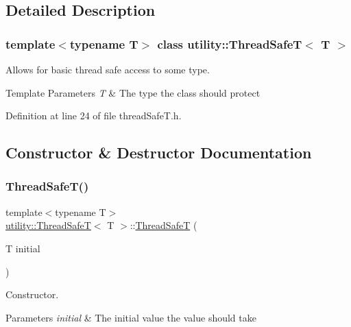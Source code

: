 \subsection{Detailed Description}
\subsubsection*{template$<$typename T$>$\newline
class utility\+::\+Thread\+Safe\+T$<$ T $>$}

Allows for basic thread safe access to some type. 


\begin{DoxyTemplParams}{Template Parameters}
{\em T} & The type the class should protect \\
\hline
\end{DoxyTemplParams}


Definition at line 24 of file thread\+Safe\+T.\+h.



\subsection{Constructor \& Destructor Documentation}
\mbox{\label{classutility_1_1ThreadSafeT_a7cdb74cfeaa11742df2953be2e43648c}} 
\subsubsection{\texorpdfstring{ThreadSafeT()}{ThreadSafeT()}}
{\footnotesize\ttfamily template$<$typename T$>$ \\
\mbox{\hyperlink{classutility_1_1ThreadSafeT}{utility\+::\+Thread\+SafeT}}$<$ T $>$\+::\mbox{\hyperlink{classutility_1_1ThreadSafeT}{Thread\+SafeT}} (\begin{DoxyParamCaption}\item[{T}]{initial }\end{DoxyParamCaption})\hspace{0.3cm}{\ttfamily [inline]}}



Constructor. 


\begin{DoxyParams}{Parameters}
{\em initial} & The initial value the value should take \\
\hline
\end{DoxyParams}


